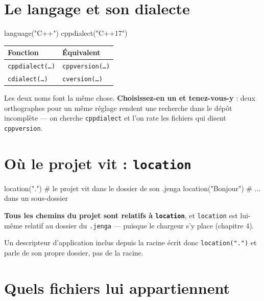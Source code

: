 \section{Le langage et son dialecte}

\begin{nkcode}{}
language("C++")
cppdialect("C++17")
\end{nkcode}

\begin{center}
\begin{tabular}{@{}ll@{}}
\toprule
\textbf{Fonction} & \textbf{Équivalent} \\
\midrule
\texttt{cppdialect(\dots)} & \texttt{cppversion(\dots)} \\
\texttt{cdialect(\dots)} & \texttt{cversion(\dots)} \\
\bottomrule
\end{tabular}
\end{center}

\begin{nkretenir}
Les deux noms font la même chose. \textbf{Choisissez-en un et tenez-vous-y} :
deux orthographes pour un même réglage rendent une recherche dans le dépôt
incomplète --- on cherche \texttt{cppdialect} et l'on rate les fichiers qui
disent \texttt{cppversion}.
\end{nkretenir}

\section{Où le projet vit : \texttt{location}}

\begin{nkcode}{}
location(".")          # le projet vit dans le dossier de son .jenga
location("Bonjour")    # ... dans un sous-dossier
\end{nkcode}

\begin{nkretenir}
\textbf{Tous les chemins du projet sont relatifs à \texttt{location}}, et
\texttt{location} est lui-même relatif au dossier du \texttt{.jenga} --- puisque
le chargeur s'y place (chapitre 4).

Un descripteur d'application inclus depuis la racine écrit donc
\texttt{location(".")} et parle de son propre dossier, pas de la racine.
\end{nkretenir}

\section{Quels fichiers lui appartiennent}

